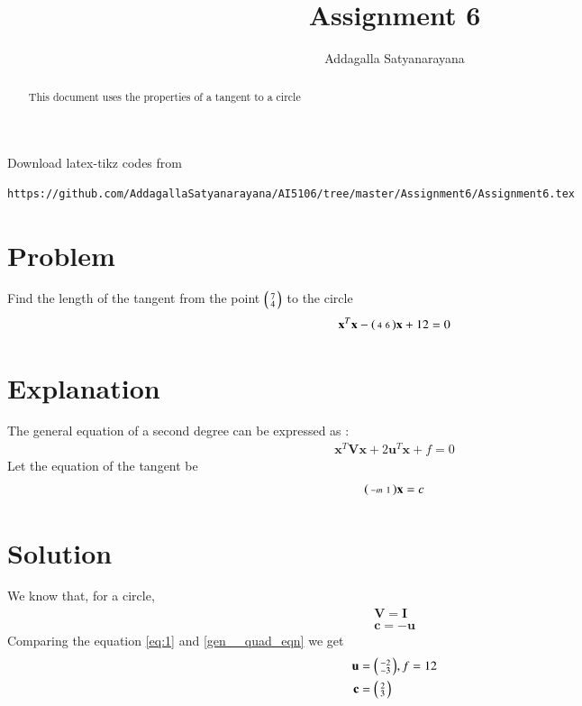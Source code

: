 \documentclass[journal,12pt,twocolumn]{IEEEtran}
\begin{document}
	\makeatother
	\let\StandardTheFigure\thefigure
	\let\vec\mathbf
	\renewcommand{\thefigure}{\theproblem}
	\def\putbox#1#2#3{\makebox[0in][l]{\makebox[#1][l]{}\raisebox{\baselineskip}[0in][0in]{\raisebox{#2}[0in][0in]{#3}}}}
	\def\rightbox#1{\makebox[0in][r]{#1}}
	\def\centbox#1{\makebox[0in]{#1}}
	\def\topbox#1{\raisebox{-\baselineskip}[0in][0in]{#1}}
	\def\midbox#1{\raisebox{-0.5\baselineskip}[0in][0in]{#1}}
	\vspace{3cm}
	\title{Assignment 6}
	\author{Addagalla Satyanarayana}
	\maketitle
	\newpage
	\bigskip
	\renewcommand{\thefigure}{\theenumi}
	\renewcommand{\thetable}{\theenumi}
\begin{abstract}
This document uses the properties of a tangent to a circle
\end{abstract}
Download latex-tikz codes from 
%
\begin{lstlisting}
https://github.com/AddagallaSatyanarayana/AI5106/tree/master/Assignment6/Assignment6.tex
\end{lstlisting}
%
\section{Problem}
Find the length of the tangent from the point $\begin{psmallmatrix}7\\4\end{psmallmatrix}$ to the circle
\begin{align}
		 \vec{x}^T\vec{x}- \myvec{4 & 6}\vec{x}+12=0\label{eq:1}
\end{align}
\section{Explanation}
The general equation of a second degree can be expressed as :
\begin{align}
	\vec{x}^T\vec{V}\vec{x}+2\vec{u}^T\vec{x}+f=0\label{gen__quad_eqn}
\end{align}
Let the equation of the tangent be
\begin{align}
	\myvec{-m & 1}\vec{x}=c \label{given_line_eq}
\end{align}

\section{Solution}
We know that, for a circle, 
\begin{align}
	\vec{V} = \vec{I}  \\
	\vec{c} = -\vec{u}
\end{align}
Comparing the equation \eqref{eq:1} and \eqref{gen__quad_eqn}
we get
\begin{align}
	\vec{u}&=\myvec{-2 \\ -3}, f=12 \\
	\vec{c}&=\myvec{2 \\ 3}
\end{align} 
\end{document}
